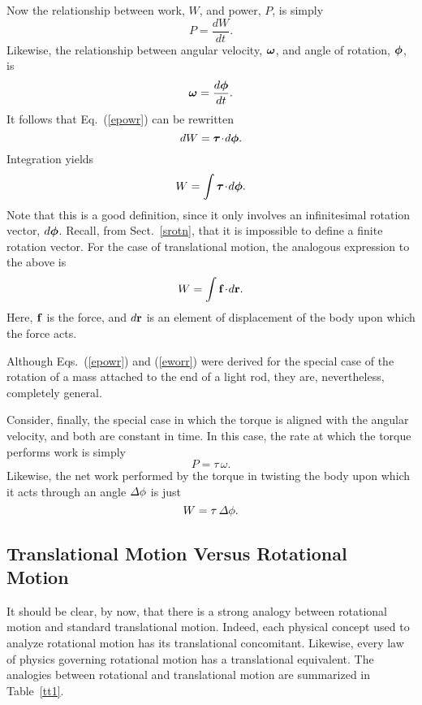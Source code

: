 Now the relationship between work, $W$, and power, $P$, is simply
\begin{equation}
P = \frac{dW}{dt}.
\end{equation}
Likewise, the relationship between angular velocity, $\mbox{\boldmath$\omega$}$, and angle
of rotation, $\mbox{\boldmath$\phi$}$, is
\begin{equation}
\mbox{\boldmath$\omega$} = \frac{d\mbox{\boldmath$\phi$}}{dt}.
\end{equation}
It follows that Eq.~(\ref{epowr}) can be rewritten
\begin{equation}
dW = \mbox{\boldmath$\tau$}\!\cdot\!d\mbox{\boldmath$\phi$}.
\end{equation}
Integration yields
\begin{equation}\label{eworr}
W = \int \mbox{\boldmath$\tau$}\!\cdot\!d \mbox{\boldmath$\phi$}.
\end{equation}
Note that this is a good definition, since it only involves an infinitesimal
rotation vector, $d\mbox{\boldmath$\phi$}$. Recall, from Sect.~\ref{srotn}, that it is impossible
to define a finite rotation vector. For the case of translational motion, the analogous
expression to the above is
\begin{equation}
W = \int {\bf f}\!\cdot\!d {\bf r}.
\end{equation}
Here, ${\bf f}$ is the force, and $d{\bf r}$ is an element of displacement of the body upon which
the force acts.

Although Eqs.~(\ref{epowr}) and (\ref{eworr}) were derived for the special case of
the rotation of a mass attached to the end of a light rod, they are, nevertheless,
completely general.

Consider, finally, the special case in which the torque is aligned with the
angular velocity, and both are constant in time. In this case, the
rate at which the torque performs work is
simply
\begin{equation}
P = \tau\,\omega.
\end{equation}
Likewise, the net work performed by the torque in twisting the body upon which
it acts through an angle ${\mit\Delta}\phi$ is just
\begin{equation}
W = \tau\,{\mit\Delta}\phi.
\end{equation}

\subsection{Translational Motion Versus Rotational Motion}
It should be clear, by now, that there is a strong analogy between rotational motion
and standard translational motion. Indeed, each physical concept used to analyze rotational
motion has its translational concomitant. Likewise, every law of physics governing
rotational motion has a translational equivalent. The analogies between rotational
and translational motion are summarized in Table~\ref{tt1}.

